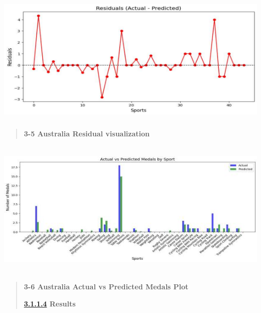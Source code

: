 \documentclass[12pt,a4paper]{article}
\renewenvironment{quote}{\begin{quotation}}{\end{quotation}}  %
\begin{document}
    \includegraphics[width=5.71833in,height=2.495in]{./media/media/image13.png}
    
    \begin{quote}
    \textbf{3-5 Australia Residual visualization}
    \end{quote}
    
    \includegraphics[width=6.30167in,height=2.62667in]{./media/media/image14.jpeg}
    
    \begin{quote}
    \textbf{3-6 Australia Actual vs Predicted Medals Plot}
    
    \textbf{\url{3.1.1.4} Results}
    \end{quote}
    
\end{document}
